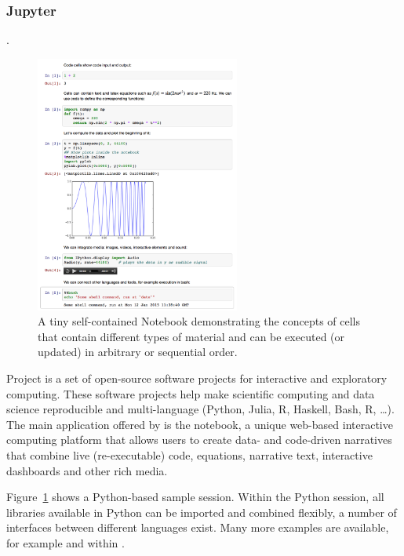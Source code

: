 \subsubsection{Jupyter}
\label{sec:jupyter}
.
\begin{figure}
\includegraphics[width=0.6\textwidth]{Pictures/jupyterdemo1.png}
\caption{\label{fig:jupyterdemo} A tiny self-contained Notebook demonstrating the concepts of cells that contain different types of material and can be executed (or updated) in arbitrary or sequential order.}
\end{figure}

Project \Jupyter is a set of open-source software projects for
interactive and exploratory computing. These software projects help
make scientific computing and data science reproducible and
multi-language (Python, Julia, R, Haskell, Bash, R, \ldots). The main
application offered by \Jupyter is the \Jupyter notebook, a unique
web-based interactive computing platform that allows users to create
data- and code-driven narratives that combine live (re-executable)
code, equations, narrative text, interactive dashboards and other rich
media. 

Figure~\ref{fig:jupyterdemo} shows a Python-based sample
session. Within the Python session, all libraries available in Python
can be imported and combined flexibly, a number of interfaces between
different languages exist. Many more examples are available, for
example \cite{IPython-demo-hyperbolic-conservation-laws} and
within \cite{IPython-sload-foundation-report-2013}.

